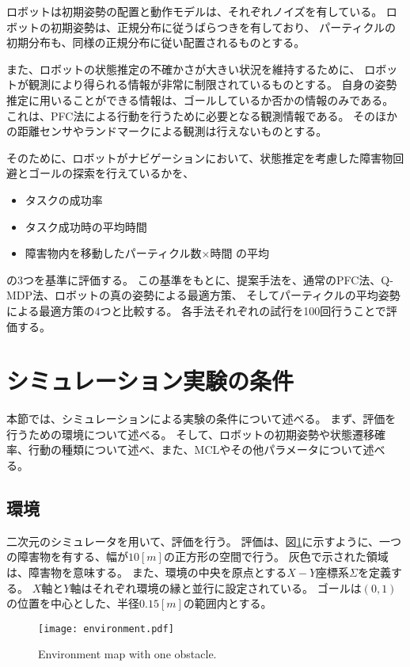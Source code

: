 ロボットは初期姿勢の配置と動作モデルは、それぞれノイズを有している。
ロボットの初期姿勢は、正規分布に従うばらつきを有しており、
パーティクルの初期分布も、同様の正規分布に従い配置されるものとする。

また、ロボットの状態推定の不確かさが大きい状況を維持するために、
ロボットが観測により得られる情報が非常に制限されているものとする。
自身の姿勢推定に用いることができる情報は、ゴールしているか否かの情報のみである。
これは、PFC法による行動を行うために必要となる観測情報である。
そのほかの距離センサやランドマークによる観測は行えないものとする。

そのために、ロボットがナビゲーションにおいて、状態推定を考慮した障害物回避とゴールの探索を行えているかを、
\begin{itemize}
  \item タスクの成功率
  \item タスク成功時の平均時間
  \item 障害物内を移動したパーティクル数×時間 の平均
\end{itemize}
の3つを基準に評価する。
この基準をもとに、提案手法を、通常のPFC法、Q-MDP法、ロボットの真の姿勢による最適方策、
そしてパーティクルの平均姿勢による最適方策の4つと比較する。
各手法それぞれの試行を100回行うことで評価する。


\section{シミュレーション実験の条件} \label{section:実験条件}
本節では、シミュレーションによる実験の条件について述べる。
まず、評価を行うための環境について述べる。
そして、ロボットの初期姿勢や状態遷移確率、行動の種類について述べ、また、MCLやその他パラメータについて述べる。

\subsection{環境}
二次元のシミュレータを用いて、評価を行う。
評価は、図\ref{fig:environment}に示すように、一つの障害物を有する、幅が$10[\si{m}]$の正方形の空間で行う。
灰色で示された領域は、障害物を意味する。
また、環境の中央を原点とする$X-Y$座標系$\Sigma$を定義する。
$X$軸と$Y$軸はそれぞれ環境の縁と並行に設定されている。
ゴールは$(0, 1)$の位置を中心とした、半径$0.15[\si{m}]$の範囲内とする。
\begin{figure}[tbp]
  \begin{center}
    \texttt{[image: environment.pdf]}
    \caption{Environment map with one obstacle.}
    \label{fig:environment}
  \end{center}
\end{figure}


